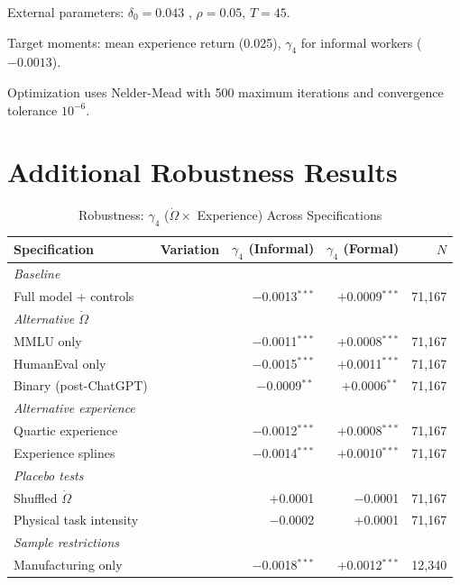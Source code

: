 \documentclass[11pt,a4paper]{article}
\theoremstyle{definition}
\begin{document}
External parameters: $\delta_0 = 0.043$ \citep{dinerstein2022depreciation}, $\rho = 0.05$, $T = 45$.

Target moments: mean experience return (0.025), $\gamma_4$ for informal workers ($-0.0013$).

Optimization uses Nelder-Mead with 500 maximum iterations and convergence tolerance $10^{-6}$.


\section{Additional Robustness Results}
\label{app:robustness}

\begin{table}[htbp]
\centering
\caption{Robustness: $\gamma_4$ ($\dot{\Omega} \times$ Experience) Across Specifications}
\label{tab:robustness_full}
\small
\begin{tabular}{llrrr}
\toprule
Specification & Variation & $\gamma_4$ (Informal) & $\gamma_4$ (Formal) & $N$ \\
\midrule
\multicolumn{5}{l}{\textit{Baseline}} \\
\quad Full model + controls & & $-$0.0013$^{***}$ & $+$0.0009$^{***}$ & 71,167 \\[3pt]
\multicolumn{5}{l}{\textit{Alternative $\dot{\Omega}$}} \\
\quad MMLU only & & $-$0.0011$^{***}$ & $+$0.0008$^{***}$ & 71,167 \\
\quad HumanEval only & & $-$0.0015$^{***}$ & $+$0.0011$^{***}$ & 71,167 \\
\quad Binary (post-ChatGPT) & & $-$0.0009$^{**}$ & $+$0.0006$^{**}$ & 71,167 \\[3pt]
\multicolumn{5}{l}{\textit{Alternative experience}} \\
\quad Quartic experience & & $-$0.0012$^{***}$ & $+$0.0008$^{***}$ & 71,167 \\
\quad Experience splines & & $-$0.0014$^{***}$ & $+$0.0010$^{***}$ & 71,167 \\[3pt]
\multicolumn{5}{l}{\textit{Placebo tests}} \\
\quad Shuffled $\dot{\Omega}$ & & $+$0.0001 & $-$0.0001 & 71,167 \\
\quad Physical task intensity & & $-$0.0002 & $+$0.0001 & 71,167 \\[3pt]
\multicolumn{5}{l}{\textit{Sample restrictions}} \\
\quad Manufacturing only & & $-$0.0018$^{***}$ & $+$0.0012$^{***}$ & 12,340 \\

\end{tabular}
\end{table}
\end{document}
